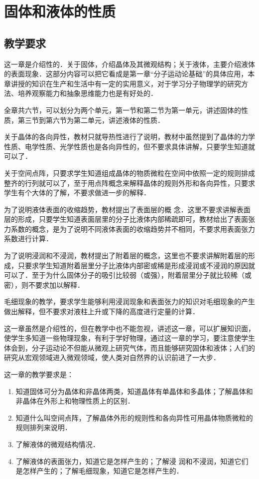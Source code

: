 \chapter{固体和液体的性质}

\minitoc[n]
\section{教学要求}


这一章是介绍性的．关于固体，介绍晶体及其微观结构；关于液体，主要介绍液体的表面现象．这部分内容可以把它看成是第一章“分子运动论基础”的具体应用，本章讲授的知识在生产和生活中有一定的实用意义，对于学习分子物理学的研究方法、培养观察能力和抽象思维能力也是有好处的．

全章共六节，可以划分为两个单元，第一节和第二节为第一单元，讲述固体的性质，第三节到第六节为第二单元，讲述液体的性质．

关于晶体的各向异性，教材只就导热性进行了说明，教材中虽然提到了晶体的力学性质、电学性质、光学性质也是各向异性的，但不要求具体讲解，只要学生知道就可以了．

关于空间点阵，只要求学生知道组成晶体的物质微粒在空间中依照一定的规则排成整齐的行列就可以了，至于用点阵概念来解释晶体的规则外形和各向异性，只要求学生有个大体的了解，不要求做进一步的解释．

为了说明液体表面的收缩趋势，教材提出了表面层的概
念．这里不要求讲解表面层的形成，只要学生知道表面层里的分子比液体内部稀疏即可，教材给出了表面张力系数的概念，是为了说明不同液体表面的收缩趋势并不相同，不要求用表面张力系数进行计算．

为了说明浸润和不浸润，教材提出了附着层的概念，这里也不要求讲解附着层的形成，只要求学生知道附着层里分子比液体内部密或稀是形成浸润或不浸润的原因就可以了．至于为什么固体分子的吸引比较弱（或强），附着层里分子就比较稀（或密），则不要求加以解释．

毛细现象的教学，要求学生能够利用浸润现象和表面张力的知识对毛细现象的产生做出解释，但不要求对液柱上升或下降的高度进行定量的计算．

这一章虽然是介绍性的，但在教学中也不能忽视，讲述这一章，可以扩展知识面，使学生多知道一些物理现象，有利于学好物理，通过这一章的学习，要注意使学生体会到，分子运动论不但能从微观上研究气体，而且能够研究固体和液体；人们的研究从宏观领域进入微观领域，使人类对自然界的认识前进了一大步．

这一章的教学要求是：
\begin{enumerate}
\item 知道固体可分为晶体和非晶体两类，知道晶体有单晶体和多晶体；了解晶体和非晶体在外形上和物理性质上的区别．
\item 知道什么叫空间点阵，了解晶体外形的规则性和各向异性可用晶体物质微粒的规则排列来说明．
\item 了解液体的微观结构情况．
\item 了解液体的表面张力，知道它是怎样产生的；了解浸
润和不浸润，知道它们是怎样产生的；了解毛细现象，知道它是怎样产生的．
\end{enumerate}


